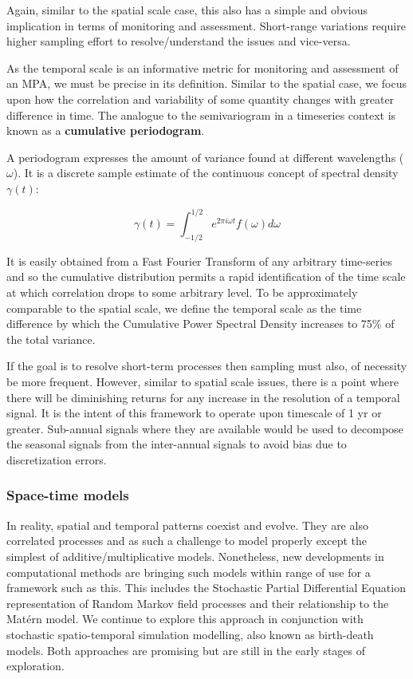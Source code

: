 \documentclass[letterpaper,portrait,11pt]{scrartcl}
\numberwithin{equation}{section}		%
\numberwithin{figure}{section}		%
\numberwithin{table}{section}				%
\begin{document}
Again, similar to the spatial scale case, this also has a simple and obvious implication in terms of monitoring and assessment. Short-range variations require higher sampling effort to resolve/understand the issues and vice-versa.

As the temporal scale is an informative metric for monitoring and assessment of an MPA, we must be precise in its definition. Similar to the spatial case, we focus upon how the correlation and variability of some quantity changes with greater difference in time. The analogue to the semivariogram in a timeseries context is known as a \textbf{cumulative periodogram}. 

A periodogram expresses the amount of variance found at different wavelengths ($\omega$). It is a discrete sample estimate of the continuous concept of spectral density $\gamma(t)$: 

\begin{equation}
  \label{eq:spectraldDensity}
  \gamma(t) = \int_{-1/2}^{1/2} e^{2\pi i \omega t} f(\omega) d \omega
\end{equation}

It is easily obtained from a Fast Fourier Transform of any arbitrary time-series and so the cumulative distribution permits a rapid identification of the time scale at which correlation drops to some arbitrary level. To be approximately comparable to the spatial scale, we define the temporal scale as the time difference by which the Cumulative Power Spectral Density increases to 75\% of the total variance.

If the goal is to resolve short-term processes then sampling must also, of necessity be more frequent. However, similar to spatial scale issues, there is a point where there will be diminishing returns for any increase in the resolution of a temporal signal. It is the intent of this framework to operate upon timescale of 1 yr or greater. Sub-annual signals where they are available would be used to decompose the seasonal signals from the inter-annual signals to avoid bias due to discretization errors. 

\subsubsection{Space-time models}

In reality, spatial and temporal patterns coexist and evolve. They are also correlated processes and as such a challenge to model properly except the simplest of additive/multiplicative models. Nonetheless, new developments in computational methods are bringing such models within range of use for a framework such as this. This includes the Stochastic Partial Differential Equation representation of Random Markov field processes and their relationship to the Mat\'{e}rn model. We continue to explore this approach in conjunction with stochastic spatio-temporal simulation modelling, also known as birth-death models. Both approaches are promising but are still in the early stages of exploration.
\end{document}
